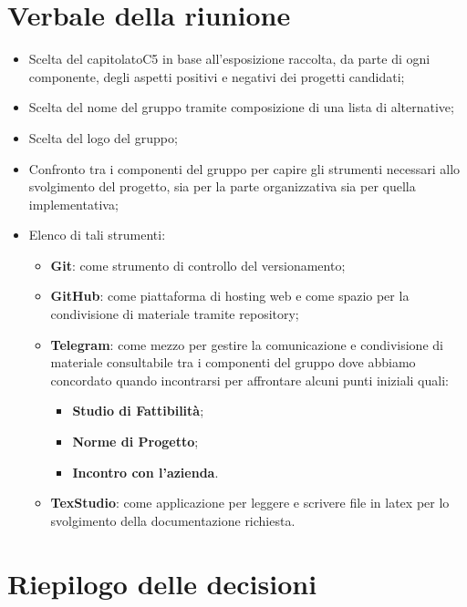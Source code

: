 \section{Verbale della riunione}
\begin{itemize}
	\item Scelta del capitolato\glosp C5 in base all'esposizione raccolta, da parte di ogni componente, 
		  degli aspetti positivi e negativi dei progetti candidati;
	\item Scelta del nome del gruppo tramite composizione di una lista di alternative;
	\item Scelta del logo del gruppo;
	\item Confronto tra i componenti del gruppo per capire gli strumenti necessari allo svolgimento del progetto, 
		  sia per la parte organizzativa sia per quella implementativa;
	\item Elenco di tali strumenti:
		\begin{itemize}
			\item \textbf{Git}: come strumento di controllo del versionamento;
			\item \textbf{GitHub}: come piattaforma di hosting web e come spazio per la condivisione di materiale tramite repository;
			\item \textbf{Telegram}: come mezzo per gestire la comunicazione e condivisione di materiale consultabile tra i componenti
			del gruppo dove abbiamo concordato quando incontrarsi per affrontare alcuni punti iniziali quali:
			\begin{itemize}
				\item \textbf{Studio di Fattibilità};
				\item \textbf{Norme di Progetto};
				\item \textbf{Incontro con l'azienda}.
			\end{itemize}
			\item \textbf{TexStudio}: come applicazione per leggere e scrivere file in latex per lo svolgimento della documentazione richiesta.
		\end{itemize} 
\end{itemize} 
\pagebreak
\section{Riepilogo delle decisioni}

	
